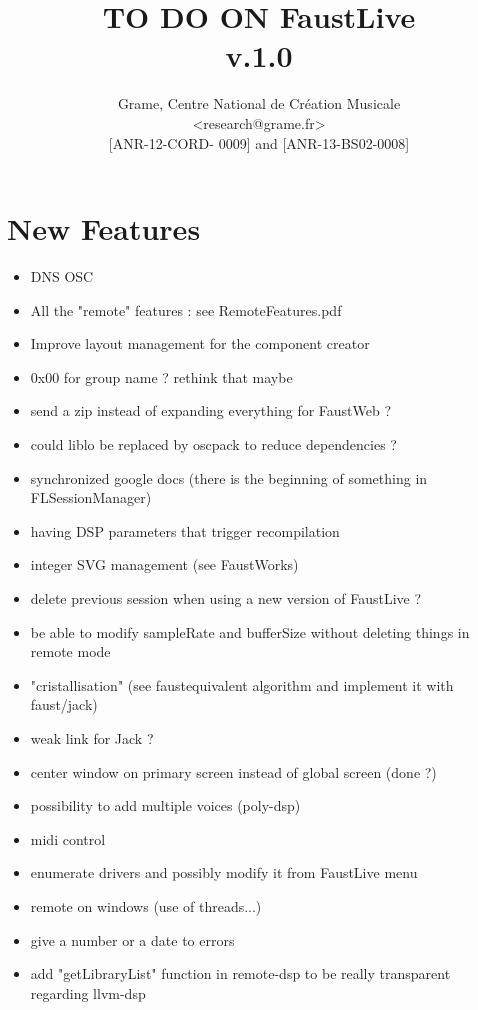 \documentclass[a4paper]{article}
\begin{document}
\title{TO DO ON FaustLive \\ v.1.0}

\author{Grame, Centre National de Création Musicale\\
{\small <research@grame.fr>} \\
\vspace{2mm}
[ANR-12-CORD- 0009] and [ANR-13-BS02-0008]
}

\maketitle


\newpage
\section{New Features}

\begin{itemize}
\item DNS OSC 
\item All the "remote" features : see RemoteFeatures.pdf
\item Improve layout management for the component creator
\item 0x00 for group name ? rethink that maybe
\item send a zip instead of expanding everything for FaustWeb ?
\item could liblo be replaced by oscpack to reduce dependencies ?
\item synchronized google docs (there is the beginning of something in FLSessionManager)
\item having DSP parameters that trigger recompilation
\item integer SVG management (see FaustWorks)
\item delete previous session when using a new version of FaustLive ?
\item be able to modify sampleRate and bufferSize without deleting things in remote mode
\item "cristallisation" (see faustequivalent algorithm and implement it with faust/jack)
\item weak link for Jack ?
\item center window on primary screen instead of global screen (done ?)
\item possibility to add multiple voices (poly-dsp)
\item midi control 
\item enumerate drivers and possibly modify it from FaustLive menu
\item remote on windows (use of threads...)
\item give a number or a date to errors
\item add "getLibraryList" function in remote-dsp to be really transparent regarding llvm-dsp
\end{itemize}
\end{document}
